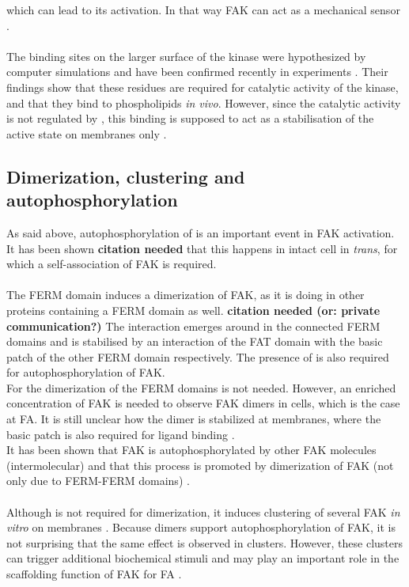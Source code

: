 which can lead to its activation. In that way FAK can act as a mechanical sensor \autocite{pap004}.\\
\\
The binding sites on the larger surface of the kinase were hypothesized by computer simulations \autocite{pap002} and have been confirmed recently in experiments \autocite{pap002Exp}. Their findings show that these residues are required for catalytic activity of the kinase, and that they bind to phospholipids {\it in vivo}.
However, since the catalytic activity is not regulated by \pip{}, this binding is supposed to act as a stabilisation of the active state on membranes only \autocite{pap002Exp}.
\subsection{Dimerization, clustering and autophosphorylation}
As said above, autophosphorylation of  is an important event in FAK activation. It has been shown {\bf citation needed} that this happens in intact cell in {\it trans}, for which a self-association of FAK is required.\\
\\
The FERM domain induces a dimerization of FAK, as it is doing in other proteins containing a FERM domain as well. {\bf citation needed (or: private communication?)} The interaction emerges around  in the connected FERM domains and is stabilised by an interaction of the FAT domain with the basic patch of the other FERM domain respectively. The presence of  is also required for autophosphorylation of FAK.\\ For the dimerization of the FERM domains \pip{} is not needed. However, an enriched concentration of FAK is needed to observe FAK dimers in cells, which is the case at FA. It is still unclear how the dimer is stabilized at membranes, where the basic patch is also required for ligand binding \autocite{fakdimers}.\\
It has been shown that FAK is autophosphorylated by other FAK molecules (intermolecular) and that this process is promoted by dimerization of FAK (not only due to FERM-FERM domains) \autocite{dimersVsClusters}.\\
\\
Although \pip{} is not required for dimerization, it induces clustering of several FAK {\it in vitro} on membranes \autocite{pap001}. Because dimers support autophosphorylation of FAK, it is not surprising that the same effect is observed in clusters. However, these clusters can trigger additional biochemical stimuli \autocite{dimersVsClusters} and may play an important role in the scaffolding function of FAK for FA \autocite{pap001}.
